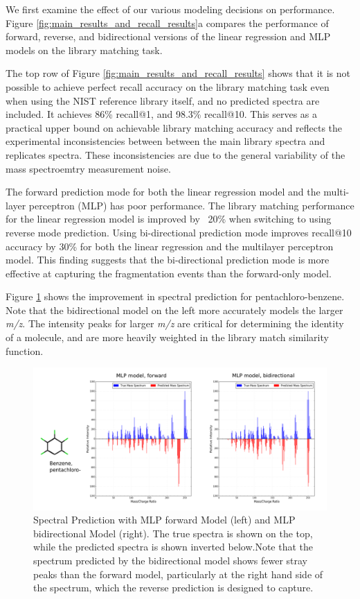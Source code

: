 We first examine the effect of our various modeling decisions on performance. Figure \ref{fig:main_results_and_recall_results}a compares the performance of forward, reverse, and bidirectional versions of the linear regression and MLP models on the library matching task. 

The top row of Figure \ref{fig:main_results_and_recall_results} shows that it is not possible to achieve perfect recall accuracy on the library matching task even when using the NIST reference library itself, and no predicted spectra are included.
It achieves 86\% recall@1, and 98.3\% recall@10. This serves as a practical upper bound on achievable library matching accuracy and reflects the experimental inconsistencies between between the main library spectra and replicates spectra. These inconsistencies are due to the general variability of the mass spectroemtry measurement noise. 

The forward prediction mode for both the linear regression model and the multi-layer perceptron (MLP) has poor performance. The library matching performance for the linear regression model is improved by ~20\% when switching to using  reverse mode prediction. Using  bi-directional prediction mode improves  recall@10 accuracy by 30\% for both the linear regression and the multilayer perceptron model. This finding suggests that the bi-directional prediction mode is more effective at capturing the fragmentation events than the forward-only model.

Figure \ref{fig:MLP_improvement_spectra} shows the improvement in spectral prediction for pentachloro-benzene. Note that the bidirectional model on the left more accurately models the larger \textit{m/z}. The intensity peaks for larger \textit{m/z} are critical for determining the identity of a molecule, and are more heavily weighted in the library match similarity function.

\begin{figure}[h]
    \centering
    \includegraphics[width=0.8\linewidth]{CEOCDNVZRAIOQZ-UHFFFAOYSA-N_mlp_model_spectra.png}
        \caption[Sample Spectra Prediction]{Spectral Prediction with MLP forward Model (left) and MLP bidirectional Model (right). The true spectra is shown on the top, while the predicted spectra is shown inverted below.\footnotemark Note that the spectrum predicted by the bidirectional model shows fewer stray peaks than the forward model, particularly at the right hand side of the spectrum, which the reverse prediction is designed to capture.}
    \label{fig:MLP_improvement_spectra}
\end{figure}

